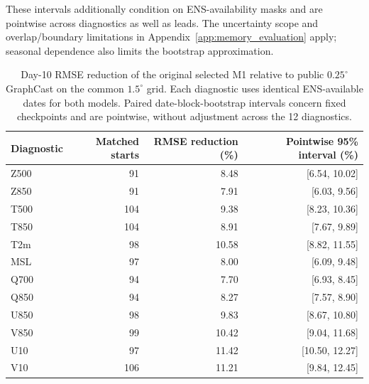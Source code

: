\documentclass{article}
\newcommand{\vfourchange}[1]{{\color{blue}#1}}
\newif\ifvfivechanges
\begin{document}
\ifvfivechanges
\par\begingroup\color{vfiveDeleted}\noindent
\sout{These are pointwise intervals conditional on the fixed checkpoints, observed year and availability masks. They quantify neither training-seed nor between-year variation, and are not simultaneous intervals across diagnostics or leads. Overlapping forecast windows and seasonal dependence limit the effective sample size; the chosen blocks retain some dependence without guaranteeing exact nominal coverage. Non-wrapping blocks underweight boundary dates. No new forecasts are generated for this uncertainty analysis.}
\par\endgroup
\fi
\vfourchange{These intervals additionally condition on ENS-availability masks and are pointwise across diagnostics as well as leads. The uncertainty scope and overlap/boundary limitations in Appendix~\ref{app:memory_evaluation} apply; seasonal dependence also limits the bootstrap approximation.}

\begin{table}[!htbp]
    \centering
    \small
    \begingroup\color{blue}
    \begin{tabular}{lrrr}
        \toprule
        Diagnostic & Matched starts & RMSE reduction (\%) & Pointwise 95\% interval (\%) \\
        \midrule
        Z500 & 91 & 8.48 & [6.54, 10.02] \\
        Z850 & 91 & 7.91 & [6.03, 9.56] \\
        T500 & 104 & 9.38 & [8.23, 10.36] \\
        T850 & 104 & 8.91 & [7.67, 9.89] \\
        T2m & 98 & 10.58 & [8.82, 11.55] \\
        MSL & 97 & 8.00 & [6.09, 9.48] \\
        Q700 & 94 & 7.70 & [6.93, 8.45] \\
        Q850 & 94 & 8.27 & [7.57, 8.90] \\
        U850 & 98 & 9.83 & [8.67, 10.80] \\
        V850 & 99 & 10.42 & [9.04, 11.68] \\
        U10 & 97 & 11.42 & [10.50, 12.27] \\
        V10 & 106 & 11.21 & [9.84, 12.45] \\
        \bottomrule
    \end{tabular}
    \endgroup
    \caption{\vfourchange{Day-10 RMSE reduction of the original selected M1 relative to public $0.25^\circ$ GraphCast on the common $1.5^\circ$ grid. Each diagnostic uses identical ENS-available dates for both models. Paired date-block-bootstrap intervals concern fixed checkpoints and are pointwise, without adjustment across the 12 diagnostics.}}
    \label{tab:common_grid_intervals}
\end{table}
\end{document}

